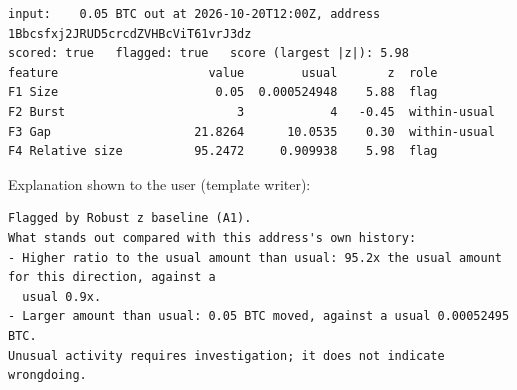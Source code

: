 {\footnotesize
\begin{verbatim}
input:    0.05 BTC out at 2026-10-20T12:00Z, address 1Bbcsfxj2JRUD5crcdZVHBcViT61vrJ3dz
scored: true   flagged: true   score (largest |z|): 5.98
feature                     value        usual       z  role
F1 Size                      0.05  0.000524948    5.88  flag
F2 Burst                        3            4   -0.45  within-usual
F3 Gap                    21.8264      10.0535    0.30  within-usual
F4 Relative size          95.2472     0.909938    5.98  flag
\end{verbatim}
}
Explanation shown to the user (template writer):
{\footnotesize
\begin{verbatim}
Flagged by Robust z baseline (A1).
What stands out compared with this address's own history:
- Higher ratio to the usual amount than usual: 95.2x the usual amount for this direction, against a
  usual 0.9x.
- Larger amount than usual: 0.05 BTC moved, against a usual 0.00052495 BTC.
Unusual activity requires investigation; it does not indicate wrongdoing.
\end{verbatim}
}
